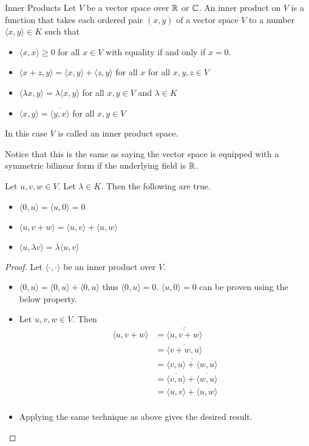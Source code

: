 \documentclass[a4paper]{article}
\begin{document}
\begin{defn}{Inner Products}{} Let $V$ be a vector space over $\mathbb{R}$ or $\mathbb{C}$. An inner product on $V$ is a function that takes each ordered pair $(x,y)$ of a vector space $V$ to a number $\langle x,y\rangle\in K$ such that 
\begin{itemize}
\item $\langle x,x\rangle\geq0$ for all $x\in V$ with equality if and only if $x=0$. 
\item $\langle x+z,y\rangle=\langle x,y\rangle+\langle z,y\rangle$ for all $x$ for all $x,y,z\in V$
\item $\langle \lambda x,y\rangle=\lambda\langle x,y\rangle$ for all $x,y\in V$ and $\lambda\in K$
\item $\langle x,y\rangle=\overline{\langle y,x\rangle}$ for all $x,y\in V$
\end{itemize}
In this case $V$ is called an inner product space. 
\end{defn}

Notice that this is the same as saying the vector space is equipped with a symmetric bilinear form if the underlying field is $\mathbb{R}$. 

\begin{prp}{}{} Let $u,v,w\in V$. Let $\lambda\in K$. Then the following are true. 
\begin{itemize}
\item $\langle 0,u\rangle=\langle u,0\rangle=0$
\item $\langle u,v+w\rangle=\langle u,v\rangle+\langle u,w\rangle$
\item $\langle u,\lambda v\rangle=\overline{\lambda}\langle u,v\rangle$
\end{itemize}\tcbline
\begin{proof} Let $\langle \cdot,\cdot\rangle$ be an inner product over $V$. 
\begin{itemize}
\item $\langle 0,u\rangle=\langle 0,u\rangle+\langle 0,u\rangle$ thus $\langle 0,u\rangle=0$. $\langle u,0\rangle=0$ can be proven using the below property. 
\item Let $u,v,w\in V$. Then 
\begin{align*}
\langle u,v+w\rangle&=\overline{\overline{\langle u,v+w\rangle}}\\
&=\overline{\langle v+w,u\rangle}\\
&=\overline{\langle v,u\rangle+\langle w,u\rangle}\\
&=\overline{\langle v,u\rangle}+\overline{\langle w,u\rangle}\\
&=\langle u,v\rangle+\langle u,w\rangle\\
\end{align*}
\item Applying the same technique as above gives the desired result. 
\end{itemize}
\end{proof}
\end{prp}
\end{document}
